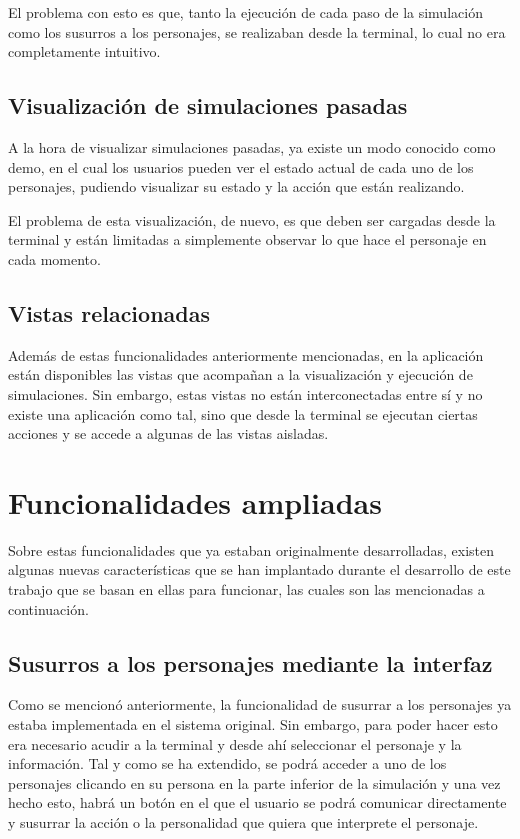 El problema con esto es que, tanto la ejecución de cada paso de la simulación como los susurros a los personajes, se realizaban desde la terminal, lo cual no era completamente intuitivo.

\subsection{Visualización de simulaciones pasadas}
A la hora de visualizar simulaciones pasadas, ya existe un modo conocido como demo, en el cual los usuarios pueden ver el estado actual de cada uno de los personajes, pudiendo visualizar su estado y la acción que están realizando.

El problema de esta visualización, de nuevo, es que deben ser cargadas desde la terminal y están limitadas a simplemente observar lo que hace el personaje en cada momento. 

\subsection{Vistas relacionadas}
Además de estas funcionalidades anteriormente mencionadas, en la aplicación están disponibles las vistas que acompañan a la visualización y ejecución de simulaciones. 
Sin embargo, estas vistas no están interconectadas entre sí y no existe una aplicación como tal, sino que desde la terminal se ejecutan ciertas acciones y se accede a algunas de las vistas aisladas.

\section{Funcionalidades ampliadas}
Sobre estas funcionalidades que ya estaban originalmente desarrolladas, existen algunas nuevas características que se han implantado durante el desarrollo de este trabajo que se basan en ellas para funcionar, las cuales son las mencionadas a continuación.

\subsection{Susurros a los personajes mediante la interfaz}
Como se mencionó anteriormente, la funcionalidad de susurrar a los personajes ya estaba implementada en el sistema original. Sin embargo, para poder hacer esto era necesario acudir a la terminal y desde ahí seleccionar el personaje y la información. 
Tal y como se ha extendido, se podrá acceder a uno de los personajes clicando en su persona en la parte inferior de la simulación y una vez hecho esto, habrá un botón en el que el usuario se podrá comunicar directamente y susurrar la acción o la personalidad que quiera que interprete el personaje.

